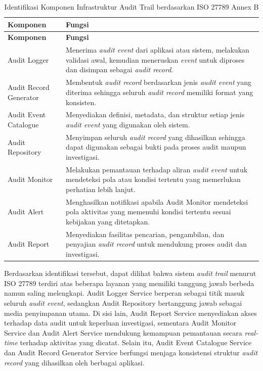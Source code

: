 \begin{xltabular}{\textwidth}{|p{4cm}|X|}
\caption{Identifikasi Komponen Infrastruktur Audit Trail berdasarkan ISO 27789 Annex B}
\label{tab:komponen_audit_trail_iso}\\

\hline
\textbf{Komponen} & \textbf{Fungsi} \\
\hline
\endfirsthead

\hline
\textbf{Komponen} & \textbf{Fungsi} \\
\hline
\endhead

\hline
\endfoot

Audit Logger  &
Menerima \textit{audit event} dari aplikasi atau sistem, melakukan validasi awal, kemudian meneruskan \textit{event} untuk diproses dan disimpan sebagai \textit{audit record}. \\
\hline

Audit Record Generator  &
Membentuk \textit{audit record} berdasarkan jenis \textit{audit event} yang diterima sehingga seluruh \textit{audit record} memiliki format yang konsisten. \\
\hline

Audit Event Catalogue  &
Menyediakan definisi, metadata, dan struktur setiap jenis \textit{audit event} yang digunakan oleh sistem. \\
\hline

Audit Repository &
Menyimpan seluruh \textit{audit record} yang dihasilkan sehingga dapat digunakan sebagai bukti pada proses audit maupun investigasi. \\
\hline

Audit Monitor  &
Melakukan pemantauan terhadap aliran \textit{audit event} untuk mendeteksi pola atau kondisi tertentu yang memerlukan perhatian lebih lanjut. \\
\hline

Audit Alert  &
Menghasilkan notifikasi apabila Audit Monitor mendeteksi pola aktivitas yang memenuhi kondisi tertentu sesuai kebijakan yang ditetapkan. \\
\hline

Audit Report &
Menyediakan fasilitas pencarian, pengambilan, dan penyajian \textit{audit record} untuk mendukung proses audit dan investigasi. \\
\hline

\end{xltabular}

Berdasarkan identifikasi tersebut, dapat dilihat bahwa sistem \textit{audit trail} menurut ISO 27789 terdiri atas beberapa layanan yang memiliki tanggung jawab berbeda namun saling melengkapi. Audit Logger Service berperan sebagai titik masuk seluruh \textit{audit event}, sedangkan Audit Repository bertanggung jawab sebagai media penyimpanan utama. Di sisi lain, Audit Report Service menyediakan akses terhadap data audit untuk keperluan investigasi, sementara Audit Monitor Service dan Audit Alert Service mendukung kemampuan pemantauan secara \textit{real-time} terhadap aktivitas yang dicatat. Selain itu, Audit Event Catalogue Service dan Audit Record Generator Service berfungsi menjaga konsistensi struktur \textit{audit record} yang dihasilkan oleh berbagai aplikasi.

